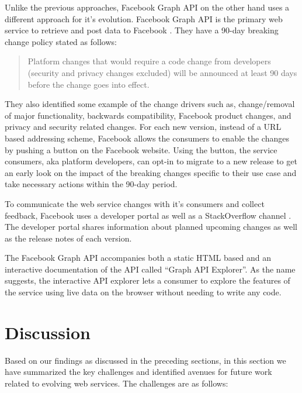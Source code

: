 \documentclass[runningheads,a4paper]{llncs}
\begin{document}
Unlike the previous approaches, Facebook Graph API on the other hand uses a different approach for it’s evolution. Facebook Graph API is the primary web service to retrieve and post data to Facebook \cite{facebook_api}. They have a 90-day breaking change policy stated as follows:

\begin{quote}
Platform changes that would require a code change from developers (security and privacy changes excluded) will be announced at least 90 days before the change goes into effect.
\end{quote}

They also identified some example of the change drivers such as, change/removal of major functionality, backwards compatibility, Facebook product changes, and privacy and security related changes. For each new version, instead of a URL based addressing scheme, Facebook allows the consumers to enable the changes by pushing a button on the Facebook website. Using the button, the service consumers, aka platform developers, can opt-in to migrate to a new release to get an early look on the impact of the breaking changes specific to their use case and take necessary actions within the 90-day period.

To communicate the web service changes with it’s consumers and collect feedback, Facebook uses a developer portal as well as a StackOverflow channel \cite{facebook_stack_overflow}. The developer portal shares information about planned upcoming changes as well as the release notes of each version.

The Facebook Graph API accompanies both a static HTML based and an interactive documentation of the API called ``Graph API Explorer''. As the name suggests, the interactive API explorer lets a consumer to explore the features of the service using live data on the browser without needing to write any code.



\section{Discussion} %
\label{sec:discussion}

Based on our findings as discussed in the preceding sections, in this section we have summarized the key challenges and identified avenues for future work related to evolving web services. The challenges are as follows:
\end{document}
